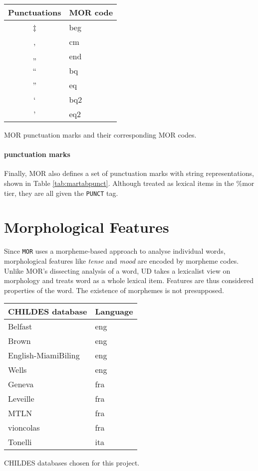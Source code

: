 \begin{margintable}[1\baselineskip] %
\begin{tabularx}{\textwidth}{@{}cl@{}}
\toprule
\textbf{Punctuations} & \textbf{MOR code}\\\midrule
‡ & beg\\
, & cm\\
„ & end\\
“ & bq\\
” & eq\\
‘ & bq2\\
’ & eq2\\\bottomrule
\end{tabularx}
\caption{\label{tab:martabpunct}MOR punctuation marks and their corresponding MOR codes.}
\footnotesize
\end{margintable}

\paragraph{punctuation marks}
Finally, MOR also defines a set of punctuation marks with string representations, shown in Table \ref{tab:martabpunct}. Although treated as lexical items in the \%mor tier, they are all given the \texttt{PUNCT} tag.

\section{Morphological Features}
\label{sec:feats}

Since \texttt{MOR} uses a morpheme-based approach to analyse individual words, morphological features like \emph{tense} and \emph{mood} are encoded by morpheme codes. Unlike MOR's dissecting analysis of a word, UD takes a lexicalist view on morphology and treats word as a whole lexical item. Features are thus considered properties of the word. The existence of morphemes is not presupposed.

\begin{margintable}[1\baselineskip]
\begin{tabularx}{1\textwidth}{@{}ll@{}}
\toprule
\textbf{CHILDES database} & \textbf{Language}\\ \midrule
	Belfast & eng\\
	Brown & eng\\
	English-MiamiBiling & eng\\
	Wells & eng\\
	Geneva & fra\\
	Leveille & fra\\
	MTLN & fra\\
	vioncolas & fra\\
	Tonelli & ita\\\bottomrule
\end{tabularx}
\caption{\label{tab:martabdb}CHILDES databases chosen for this project.}
\footnotesize
\end{margintable}

